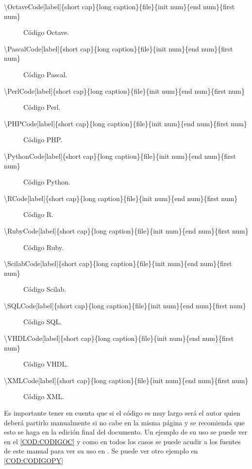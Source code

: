 \begin{description}
\item [\textbackslash OctaveCode{[label]}\{short cap\}\{long caption\}\{file\}\{init num\}\{end num\}\{first num\}] Código Octave.
\item [\textbackslash PascalCode{[label]}\{short cap\}\{long caption\}\{file\}\{init num\}\{end num\}\{first num\}] Código Pascal.
\item [\textbackslash PerlCode{[label]}\{short cap\}\{long caption\}\{file\}\{init num\}\{end num\}\{first num\}] Código Perl.
\item [\textbackslash PHPCode{[label]}\{short cap\}\{long caption\}\{file\}\{init num\}\{end num\}\{first num\}] Código PHP.
\item [\textbackslash PythonCode{[label]}\{short cap\}\{long caption\}\{file\}\{init num\}\{end num\}\{first num\}] Código Python.
\item [\textbackslash RCode{[label]}\{short cap\}\{long caption\}\{file\}\{init num\}\{end num\}\{first num\}] Código R.
\item [\textbackslash RubyCode{[label]}\{short cap\}\{long caption\}\{file\}\{init num\}\{end num\}\{first num\}] Código Ruby.
\item [\textbackslash ScilabCode{[label]}\{short cap\}\{long caption\}\{file\}\{init num\}\{end num\}\{first num\}] Código Scilab.
\item [\textbackslash SQLCode{[label]}\{short cap\}\{long caption\}\{file\}\{init num\}\{end num\}\{first num\}] Código SQL.
\item [\textbackslash VHDLCode{[label]}\{short cap\}\{long caption\}\{file\}\{init num\}\{end num\}\{first num\}] Código VHDL.
\item [\textbackslash XMLCode{[label]}\{short cap\}\{long caption\}\{file\}\{init num\}\{end num\}\{first num\}] Código XML.
\end{description}

Es importante tener en cuenta que si el código es muy largo será el autor quien deberá partirlo manualmente si no cabe en la misma página y se recomienda que esto se haga en la edición final del documento. Un ejemplo de su uso se puede ver en el \cref{COD:CODIGOC} y como en todos los casos se puede acudir a los fuentes de este manual para ver su uso en \LaTeXe. Se puede ver otro ejemplo en \cref{COD:CODIGOPY}



